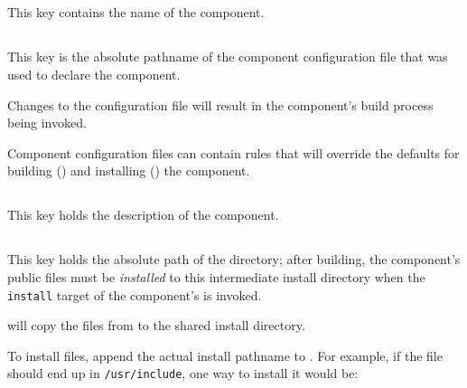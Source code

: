 
\subsection{}\label{variables:component}

This key contains the name of the component.


\subsection{}\label{variables:configuration-file}

This key is the absolute pathname of the component configuration file
that was used to declare the component.

Changes to the configuration file will result in the component's build
process being invoked.

Component configuration files can contain \makefile rules that will
override the defaults for building
() and installing
() the component.


\subsection{}\label{variables:description}

This key holds the description of the component.


\subsection{}\label{variables:destdir-directory}

This key holds the absolute path of the \destdir directory; after
building, the component's public files must be \emph{installed} to this
intermediate install directory when the \texttt{install} target of the
component's \makefile is invoked.

\lmsbw will copy the files from \destdir to the shared install directory.

To install files, append the actual install pathname to \destdir.  For
example, if the file should end up in \texttt{/usr/include}, one way
to install it would be:

